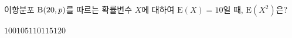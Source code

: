 이항분포 $\mathrm{B}(20{,}\mkern3mu\mathopen{}p)$를 따르는 확률변수 $X$에 대하여 $\mathrm{E}(X)=10$일 때, $\mathrm{E}(X^2)$은?
\begin{choices32}{$100$}{$105$}{$110$}{$115$}{$120$}\end{choices32}
